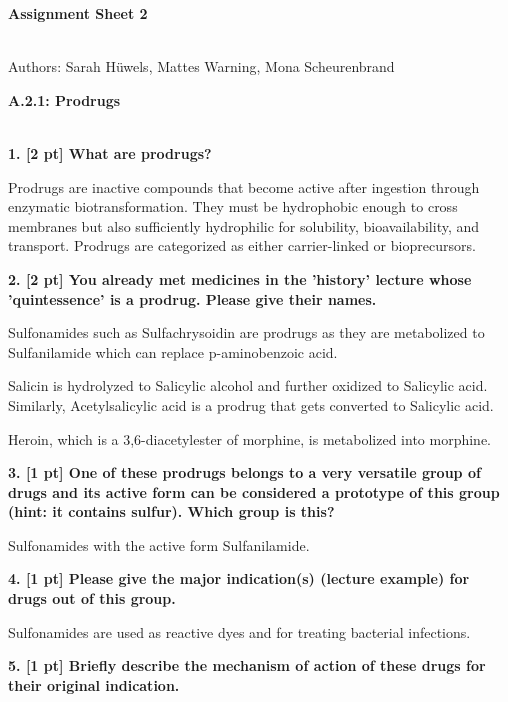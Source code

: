 \documentclass[a4paper,10pt]{article}
\begin{document}


\begin{huge}
	\vspace{1cm}
	\textbf{Assignment Sheet 2}
\end{huge} \\

Authors: Sarah Hüwels, Mattes Warning, Mona Scheurenbrand

\begin{large}
	\vspace{1.0cm}
	\textbf{A.2.1: Prodrugs}
\end{large}	\\ [2mm]

\textbf{1. [2 pt] What are prodrugs?}

Prodrugs are inactive compounds that become active after ingestion through enzymatic biotransformation. They must be hydrophobic enough to cross membranes but also sufficiently hydrophilic for solubility, bioavailability, and transport. Prodrugs are categorized as either carrier-linked or bioprecursors. \cite{ABET2017810}


\textbf{2. [2 pt] You already met medicines in the ’history’ lecture whose ’quintessence’ is a prodrug. Please give their names.}

Sulfonamides such as Sulfachrysoidin are prodrugs as they are metabolized to Sulfanilamide which can replace p-aminobenzoic acid.

Salicin is hydrolyzed to Salicylic alcohol and further oxidized to Salicylic acid. Similarly, Acetylsalicylic acid is a prodrug that gets converted to Salicylic acid. 

Heroin, which is a 3,6-diacetylester of morphine, is metabolized into morphine.

\textbf{3. [1 pt] One of these prodrugs belongs to a very versatile group of drugs and its active form can be considered a prototype of this group (hint: it contains sulfur). Which group is this?}

Sulfonamides with the active form Sulfanilamide.

\textbf{4. [1 pt] Please give the major indication(s) (lecture example) for drugs out of this group.}

Sulfonamides are used as reactive dyes and for treating bacterial infections.

\textbf{5. [1 pt] Briefly describe the mechanism of action of these drugs for their original indication.}
\end{document}
